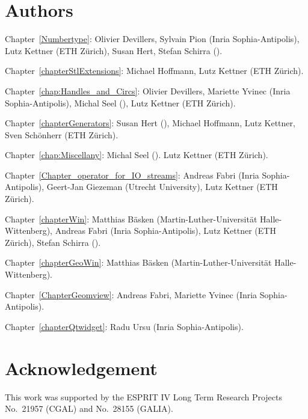 \section*{Authors}

Chapter~\ref{Numbertype}: 
Olivier Devillers, Sylvain Pion ({\sc Inria} Sophia-Antipolis),
Lutz Kettner (ETH Z\"urich),
Susan Hert, Stefan Schirra ().

Chapter~\ref{chapterStlExtensions}: 
Michael Hoffmann, Lutz Kettner (ETH Z\"urich).

Chapter~\ref{chap:Handles_and_Circs}:
Olivier Devillers, Mariette Yvinec ({\sc Inria} Sophia-Antipolis),
Michal Seel (),
Lutz Kettner (ETH Z\"urich).

Chapter~\ref{chapterGenerators}: 
Susan Hert (),
Michael Hoffmann, Lutz Kettner, Sven Sch\"onherr (ETH Z\"urich).

Chapter~\ref{chap:Miscellany}:
Michal Seel ().
Lutz Kettner (ETH Z\"urich).

Chapter~\ref{Chapter_operator_for_IO_streams}: 
Andreas Fabri ({\sc Inria} Sophia-Antipolis),
Geert-Jan Giezeman (Utrecht University),
Lutz Kettner (ETH Z\"urich).

Chapter~\ref{chapterWin}:
Matthias B\"asken (Martin-Luther-Universit{\"a}t Halle-Wittenberg),
Andreas Fabri ({\sc Inria} Sophia-Antipolis),
Lutz Kettner (ETH Z\"urich),
Stefan Schirra ().

Chapter~\ref{chapterGeoWin}:
Matthias B\"asken (Martin-Luther-Universit{\"a}t Halle-Wittenberg).

Chapter~\ref{ChapterGeomview}:
Andreas Fabri, Mariette Yvinec ({\sc Inria} Sophia-Antipolis).

Chapter~\ref{chapterQtwidget}:
Radu Ursu ({\sc Inria} Sophia-Antipolis).

\section*{Acknowledgement}

This work was supported
by the ESPRIT IV Long Term Research Projects No.~21957 (CGAL)
and No.~28155 (GALIA).


